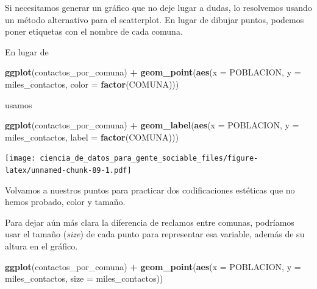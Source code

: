 \documentclass[spanish,]{book}
\newenvironment{Shaded}{\begin{snugshade}}{\end{snugshade}}
\newcommand{\DataTypeTok}[1]{\textcolor[rgb]{0.13,0.29,0.53}{#1}}
\newcommand{\KeywordTok}[1]{\textcolor[rgb]{0.13,0.29,0.53}{\textbf{#1}}}
\newcommand{\NormalTok}[1]{#1}
\newcommand{\OperatorTok}[1]{\textcolor[rgb]{0.81,0.36,0.00}{\textbf{#1}}}
\newcommand{\StringTok}[1]{\textcolor[rgb]{0.31,0.60,0.02}{#1}}
\begin{document}
Si necesitamos generar un gráfico que no deje lugar a dudas, lo resolvemos usando un método alternativo para el scatterplot. En lugar de dibujar puntos, podemos poner etiquetas con el nombre de cada comuna.

En lugar de

\begin{Shaded}
\begin{Highlighting}[]
\KeywordTok{ggplot}\NormalTok{(contactos_por_comuna) }\OperatorTok{+}\StringTok{ }
\StringTok{    }\KeywordTok{geom_point}\NormalTok{(}\KeywordTok{aes}\NormalTok{(}\DataTypeTok{x =}\NormalTok{ POBLACION, }\DataTypeTok{y =}\NormalTok{ miles_contactos, }\DataTypeTok{color =} \KeywordTok{factor}\NormalTok{(COMUNA)))}
\end{Highlighting}
\end{Shaded}

usamos

\begin{Shaded}
\begin{Highlighting}[]
\KeywordTok{ggplot}\NormalTok{(contactos_por_comuna) }\OperatorTok{+}
\StringTok{    }\KeywordTok{geom_label}\NormalTok{(}\KeywordTok{aes}\NormalTok{(}\DataTypeTok{x =}\NormalTok{ POBLACION, }\DataTypeTok{y =}\NormalTok{ miles_contactos, }\DataTypeTok{label =} \KeywordTok{factor}\NormalTok{(COMUNA)))}
\end{Highlighting}
\end{Shaded}

\texttt{[image: ciencia\_de\_datos\_para\_gente\_sociable\_files/figure-latex/unnamed-chunk-89-1.pdf]}

Volvamos a nuestros puntos para practicar dos codificaciones estéticas que no hemos probado, color y tamaño.

Para dejar aún más clara la diferencia de reclamos entre comunas, podríamos usar el tamaño (\emph{size}) de cada punto para representar esa variable, además de su altura en el gráfico.

\begin{Shaded}
\begin{Highlighting}[]
\KeywordTok{ggplot}\NormalTok{(contactos_por_comuna) }\OperatorTok{+}\StringTok{ }
\StringTok{    }\KeywordTok{geom_point}\NormalTok{(}\KeywordTok{aes}\NormalTok{(}\DataTypeTok{x =}\NormalTok{ POBLACION, }\DataTypeTok{y =}\NormalTok{ miles_contactos, }\DataTypeTok{size =}\NormalTok{ miles_contactos))}
\end{Highlighting}
\end{Shaded}
\end{document}
